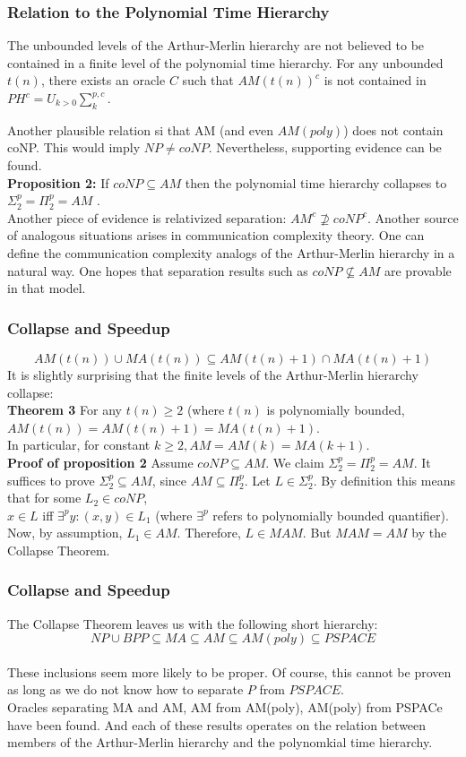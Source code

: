 \documentclass{beamer}
\begin{document}
\begin{frame}
\frametitle{Relation to the Polynomial Time Hierarchy}
The unbounded levels of the Arthur-Merlin hierarchy are not believed to be contained in a finite level of the polynomial time hierarchy. For any unbounded $t(n)$, there exists an oracle $C$ such that $AM(t(n))^c$ is not contained in $PH^c = U_{k>0} \sum_k^{p,c}$.

Another plausible relation si that AM (and even $AM(poly)$) does not contain coNP. This would imply $NP \neq coNP$. Nevertheless, supporting evidence can be found.\\
\textbf{Proposition 2:} If $coNP \subseteq AM$ then the polynomial time hierarchy collapses to $\Sigma_2^p = \Pi_2^p = AM$ .\\
Another piece of evidence is relativized separation:  $AM^c \nsupseteq coNP^c$.
Another source of analogous situations arises in communication complexity theory. One can define the communication complexity analogs of the Arthur-Merlin hierarchy in a natural way. One hopes that separation results such as $coNP \nsubseteq AM$ are provable in that model.
\end{frame}

\begin{frame}
\frametitle{Collapse and Speedup}
$$AM(t(n)) \cup MA(t(n)) \subseteq AM(t(n) + 1) \cap MA(t(n) + 1)$$
It is slightly surprising that the finite levels of the Arthur-Merlin hierarchy collapse:\\
\textbf{Theorem 3}
For any $t(n) \geq 2$ (where $t(n)$ is polynomially bounded, $AM(t(n)) = AM(t(n)+1) = MA(t(n)+1)$.\\
In particular, for constant $k \geq 2, AM = AM(k) = MA(k + 1)$.\\
\textbf{Proof of proposition 2}
Assume $coNP \subseteq AM$. We claim $\Sigma_2^p = \Pi_2^p = AM$. It suffices to prove $\Sigma_2^p \subseteq AM$, since $AM \subseteq \Pi_2^p$.
Let $L \in \Sigma_2^p$. By definition this means that for some $L_2 \in coNP$, \\
$x \in L$ iff $\exists^p y: (x,y) \in L_1$ (where $\exists^p$ refers to polynomially bounded quantifier).\\
Now, by assumption, $L_1 \in AM$. Therefore, $L \in MAM$. But $MAM = AM$ by the Collapse Theorem.
\end{frame}

\begin{frame}
\frametitle{Collapse and Speedup}
The Collapse Theorem leaves us with the following short hierarchy:
$$NP \cup BPP \subseteq MA \subseteq AM \subseteq AM(poly) \subseteq PSPACE$$\\
These inclusions seem more likely to be proper. Of course, this cannot be proven as long as we do not know how to separate $P$ from $PSPACE$.\\
Oracles separating MA and AM, AM from AM(poly), AM(poly) from PSPACe have been found. And each of these results operates on the relation between members of the Arthur-Merlin hierarchy and the polynomkial time hierarchy.

\end{frame}
\end{document}
